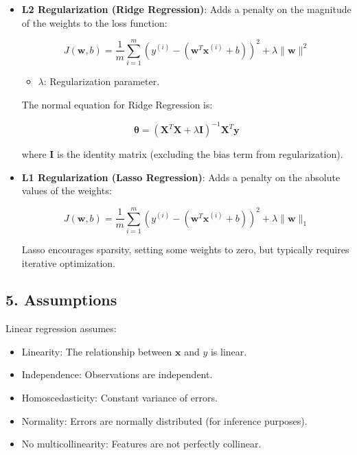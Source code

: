 \documentclass[a4paper,12pt]{article}
\begin{document}
\begin{itemize}
    \item \textbf{L2 Regularization (Ridge Regression)}: Adds a penalty on the magnitude of the weights to the loss function:

    \[
    J(\mathbf{w}, b) = \frac{1}{m} \sum_{i=1}^m (y^{(i)} - (\mathbf{w}^T \mathbf{x}^{(i)} + b))^2 + \lambda \| \mathbf{w} \|^2
    \]

    \begin{itemize}
        \item $\lambda$: Regularization parameter.
    \end{itemize}

    The normal equation for Ridge Regression is:

    \[
    \boldsymbol{\theta} = (\mathbf{X}^T \mathbf{X} + \lambda \mathbf{I})^{-1} \mathbf{X}^T \mathbf{y}
    \]

    where $\mathbf{I}$ is the identity matrix (excluding the bias term from regularization).

    \item \textbf{L1 Regularization (Lasso Regression)}: Adds a penalty on the absolute values of the weights:

    \[
    J(\mathbf{w}, b) = \frac{1}{m} \sum_{i=1}^m (y^{(i)} - (\mathbf{w}^T \mathbf{x}^{(i)} + b))^2 + \lambda \| \mathbf{w} \|_1
    \]

    Lasso encourages sparsity, setting some weights to zero, but typically requires iterative optimization.
\end{itemize}

\subsection*{5. Assumptions}
Linear regression assumes:
\begin{itemize}
    \item Linearity: The relationship between $\mathbf{x}$ and $y$ is linear.
    \item Independence: Observations are independent.
    \item Homoscedasticity: Constant variance of errors.
    \item Normality: Errors are normally distributed (for inference purposes).
    \item No multicollinearity: Features are not perfectly collinear.
\end{itemize}
\end{document}
